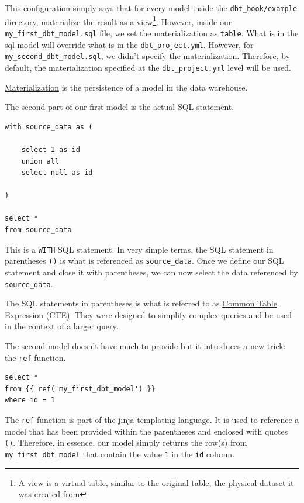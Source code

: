 \documentclass[
]{book}
\begin{document}
This configuration simply says that for every model inside the \texttt{dbt\_book/example} directory, materialize the result as a view\footnote{A view is a virtual table, similar to the original table, the physical dataset it was created from}. However, inside our \texttt{my\_first\_dbt\_model.sql} file, we set the materialization as \texttt{table}. What is in the sql model will override what is in the \texttt{dbt\_project.yml}. However, for \texttt{my\_second\_dbt\_model.sql}, we didn't specify the materialization. Therefore, by default, the materialization specified at the \texttt{dbt\_project.yml} level will be used.

\href{https://docs.getdbt.com/docs/build/materializations}{Materialization} is the persistence of a model in the data warehouse.

The second part of our first model is the actual SQL statement.

\begin{verbatim}
with source_data as (

    select 1 as id
    union all
    select null as id

)

select *
from source_data
\end{verbatim}

This is a \texttt{WITH} SQL statement. In very simple terms, the SQL statement in parentheses \texttt{()} is what is referenced as \texttt{source\_data}. Once we define our SQL statement and close it with parentheses, we can now select the data referenced by \texttt{source\_data}.

The SQL statements in parentheses is what is referred to as \href{https://www.atlassian.com/data/sql/using-common-table-expressions}{Common Table Expression (CTE)}. They were designed to simplify complex queries and be used in the context of a larger query.

The second model doesn't have much to provide but it introduces a new trick: the \texttt{ref} function.

\begin{verbatim}
select *
from {{ ref('my_first_dbt_model') }}
where id = 1
\end{verbatim}

The \texttt{ref} function is part of the jinja templating language. It is used to reference a model that has been provided within the parentheses and enclosed with quotes \texttt{(\textquotesingle{}\textquotesingle{})}. Therefore, in essence, our model simply returns the row(s) from \texttt{my\_first\_dbt\_model} that contain the value \texttt{1} in the \texttt{id} column.
\end{document}
